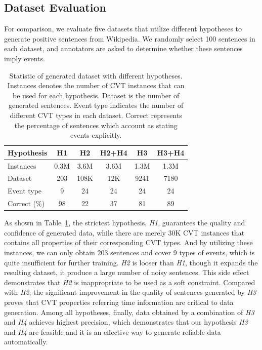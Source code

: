 \documentclass{article}
\begin{document}
\subsection{Dataset Evaluation}\label{sec:evalhypo}
For comparison, we evaluate five datasets that utilize different hypotheses to generate positive sentences from Wikipedia. We randomly select 100 sentences in each dataset, and annotators are asked to determine whether these sentences imply events. 

\begin{table}[h]
\small
\centering
\begin{tabular}{|l|c|c|c|c|c|} \hline
	Hypothesis & H1 & H2 & H2+H4 & H3 & H3+H4 \\ \hline
	Instances & 0.3M & 3.6M & 3.6M & 1.3M & 1.3M \\ \hline
	Dataset & 203 & 108K & 12K & 9241 & 7180 \\ \hline
	Event type & 9 & 24 & 24 & 24 & 24 \\ \hline
	Correct (\%) & 98 & 22 & 37 & 81 & 89 \\ \hline
\end{tabular}
\caption{Statistic of generated dataset with different hypotheses. Instances denotes the number of CVT instances that can be used for each hypothesis. Dataset is the number of generated sentences. Event type indicates the number of different CVT types in each dataset. Correct represents the percentage of sentences which account as stating events explicitly. \label{tab:3}}
\end{table}

As shown in Table~\ref{tab:3}, the strictest hypothesis, \emph{H1}, guarantees the quality and confidence of generated data, while there are merely 30K CVT instances that contains all properties of their corresponding CVT types. And by utilizing these instances, we can only obtain 203 sentences and cover 9 types of events, which is quite insufficient for further training. \emph{H2} is looser than \emph{H1}, though it expands the resulting dataset, it produce a large number of noisy sentences. This side effect  demonstrates that \emph{H2} is inappropriate to be used as a soft constraint. Compared with \emph{H2}, the significant improvement in the quality of sentences generated by \emph{H3} proves that CVT properties referring time information are critical to data generation. Among all hypotheses, finally, data obtained by a combination of \emph{H3} and \emph{H4} achieves highest precision, which demonstrates that our hypothesis \emph{H3} and \emph{H4} are feasible and it is an effective way to generate reliable data automatically.
\end{document}
